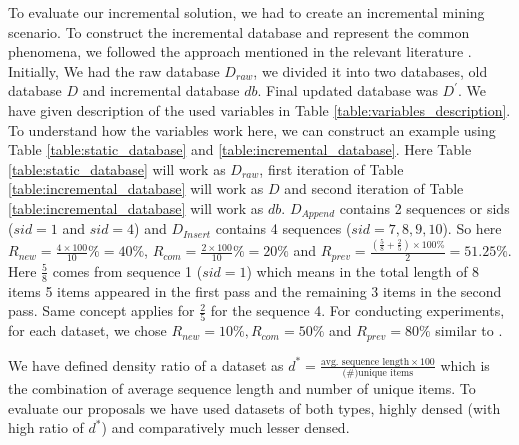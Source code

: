 To evaluate our incremental solution, we had to create an incremental mining scenario. To construct the incremental database and represent the common phenomena, we followed the approach mentioned in the relevant literature \cite{lin2004incremental}. Initially, We had the raw database $D_{raw}$, we divided it into two databases, old database $D$ and incremental database $db$. Final updated database was $D^{\prime}$. We have given description of the used variables in Table \ref{table:variables_description}. To understand how the variables work here, we can construct an example using Table \ref{table:static_database} and \ref{table:incremental_database}. Here Table \ref{table:static_database} will work as $D_{raw}$, first iteration of Table \ref{table:incremental_database} will work as $D$ and second iteration of Table \ref{table:incremental_database} will work as $db$. $D_{Append}$ contains 2 sequences or sids ($sid=1$ and $sid=4$) and $D_{Insert}$ contains 4 sequences ($sid=7,8,9,10$). So here $R_{new}=\frac{4\times100}{10}\%=40\%$, $R_{com}=\frac{2 \times 100}{10}\%=20\%$ and $R_{prev}=\frac{(\frac{5}{8}+\frac{2}{5})\times 100\%}{2}=51.25\%$. Here $\frac{5}{8}$ comes from sequence 1 ($sid=1$) which means in the total length of 8 items 5 items appeared in the first pass and the remaining 3 items in the second pass. Same concept applies for $\frac{2}{5}$ for the sequence 4. For conducting experiments, for each dataset, we chose $R_{new}=10\%, R_{com}=50\%$ and $R_{prev}=80\%$ similar to \cite{lin2004incremental}. 



We have defined density ratio of a dataset as $d^{*} = \frac{\text{avg. sequence length} \times 100}{\text{(\#)unique items}}$ which is the combination of average sequence length and number of unique items. To evaluate our proposals we have used datasets of both types, highly densed (with high ratio of $d^{*}$) and comparatively much lesser densed. 



